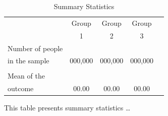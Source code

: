 \begin{table}[H]
    \begin{center}
    \caption{Summary Statistics}
    \begin{tabular}{lcccc} 
    \toprule
    & Group & Group & Group \\
    & 1 & 2 & 3 \\
    \midrule
    Number of people \\
    in the sample & 000,000 & 000,000 & 000,000  \\
    \\
    Mean of the \\
    outcome & 00.00 & 00.00 & 00.00 \\
    \bottomrule
    \end{tabular}
    \label{tab:summary_stats}
    \end{center}
    
	\begin{minipage}{0.90\textwidth} 
	{\footnotesize 
    This table presents summary statistics \ldots
	\par}
	\end{minipage}
\end{table}
